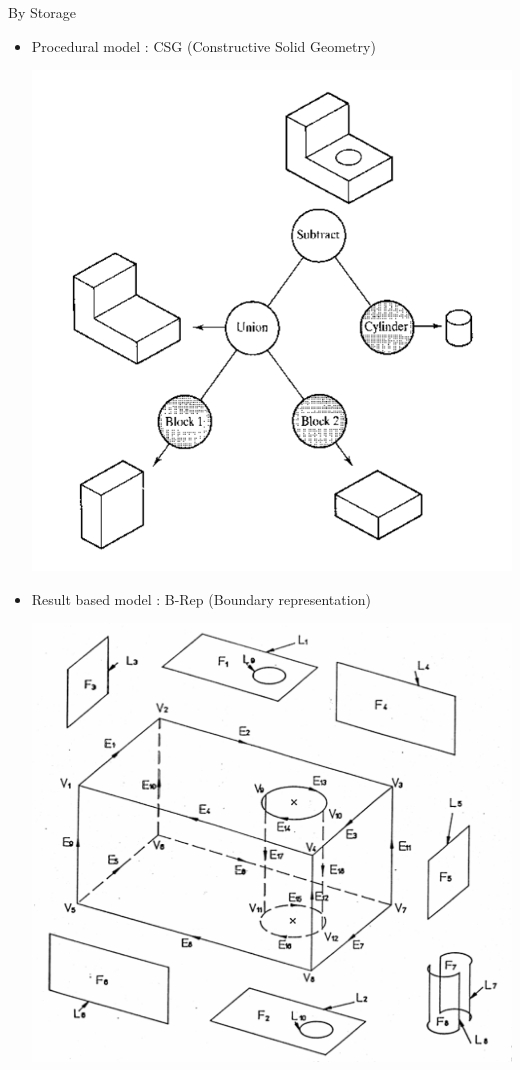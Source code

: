 \begin{frame}{By Storage}
\begin{itemize}
\item Procedural model : CSG (Constructive Solid Geometry)

\includegraphics[scale=0.2]{images/CADCSG.png}
\item Result based model : B-Rep (Boundary representation)

\includegraphics[scale=0.2]{images/CADBrep.png}
\end{itemize}
\end{frame}